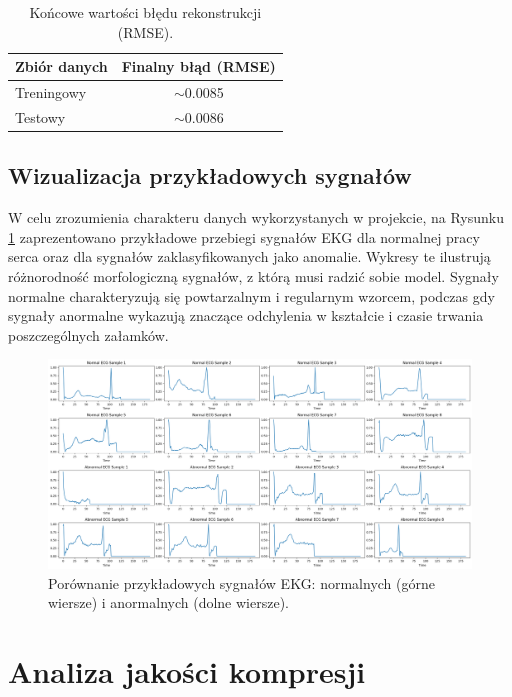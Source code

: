 \documentclass[12pt,a4paper]{article}
\begin{document}
\begin{table}[H]
\centering
\begin{tabular}{@{}lc@{}}
\toprule
\textbf{Zbiór danych} & \textbf{Finalny błąd (RMSE)} \\
\midrule
Treningowy & $\sim$0.0085 \\
Testowy & $\sim$0.0086 \\
\bottomrule
\end{tabular}
\caption{Końcowe wartości błędu rekonstrukcji (RMSE).}
\label{tab:final_metrics}
\end{table}

\subsection{Wizualizacja przykładowych sygnałów}

W celu zrozumienia charakteru danych wykorzystanych w projekcie, na Rysunku \ref{fig:ecg_samples} zaprezentowano przykładowe przebiegi sygnałów EKG dla normalnej pracy serca oraz dla sygnałów zaklasyfikowanych jako anomalie. Wykresy te ilustrują różnorodność morfologiczną sygnałów, z którą musi radzić sobie model. Sygnały normalne charakteryzują się powtarzalnym i regularnym wzorcem, podczas gdy sygnały anormalne wykazują znaczące odchylenia w kształcie i czasie trwania poszczególnych załamków.

\begin{figure}[H]
    \centering
    \includegraphics[width=\textwidth]{ecg_samples.png}
    \caption{Porównanie przykładowych sygnałów EKG: normalnych (górne wiersze) i anormalnych (dolne wiersze).}
    \label{fig:ecg_samples}
\end{figure}

\section{Analiza jakości kompresji}
\end{document}
